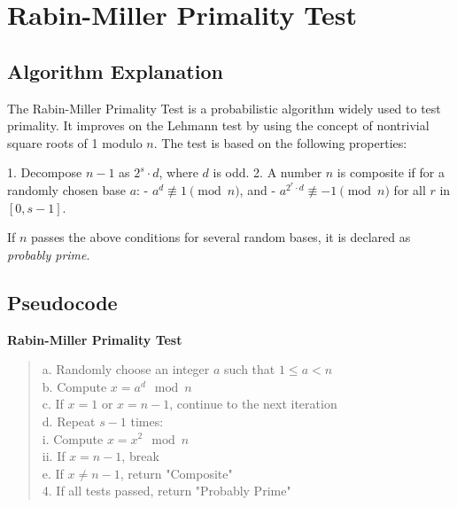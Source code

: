 \documentclass[12pt]{article}
\begin{document}
\section{Rabin-Miller Primality Test}

\subsection*{Algorithm Explanation}

The Rabin-Miller Primality Test is a probabilistic algorithm widely used to test primality. It improves on the Lehmann test by using the concept of nontrivial square roots of 1 modulo \( n \). The test is based on the following properties:

1. Decompose \( n-1 \) as \( 2^s \cdot d \), where \( d \) is odd.
2. A number \( n \) is composite if for a randomly chosen base \( a \):
   - \( a^d \not\equiv 1 \pmod{n} \), and
   - \( a^{2^r \cdot d} \not\equiv -1 \pmod{n} \) for all \( r \) in \( [0, s-1] \).

If \( n \) passes the above conditions for several random bases, it is declared as \emph{probably prime}.

\subsection*{Pseudocode}

\textbf{Rabin-Miller Primality Test}


\begin{quote}\ttfamily
\hspace*{2em} a. Randomly choose an integer \( a \) such that \( 1 \leq a < n \) \\
\hspace*{2em} b. Compute \( x = a^d \mod n \) \\
\hspace*{2em} c. If \( x = 1 \) or \( x = n-1 \), continue to the next iteration \\
\hspace*{2em} d. Repeat \( s-1 \) times: \\
\hspace*{4em} i. Compute \( x = x^2 \mod n \) \\
\hspace*{4em} ii. If \( x = n-1 \), break \\
\hspace*{2em} e. If \( x \neq n-1 \), return "Composite" \\
4. If all tests passed, return "Probably Prime"
\end{quote}
\end{document}
